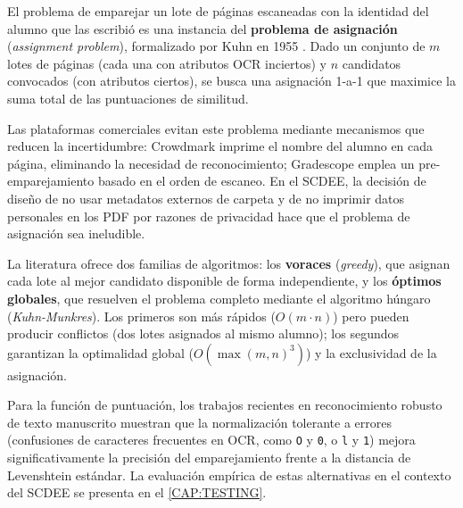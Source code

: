 El problema de emparejar un lote de páginas escaneadas con la identidad
del alumno que las escribió es una instancia del \textbf{problema de
asignación} (\textit{assignment problem}), formalizado por Kuhn en 1955
\cite{kuhn1955hungarian}. Dado un conjunto de \(m\) lotes de páginas
(cada una con atributos OCR inciertos) y \(n\) candidatos convocados
(con atributos ciertos), se busca una asignación 1-a-1 que maximice la
suma total de las puntuaciones de similitud.

Las plataformas comerciales evitan este problema mediante mecanismos que
reducen la incertidumbre: Crowdmark imprime el nombre del alumno en cada
página, eliminando la necesidad de reconocimiento; Gradescope emplea un
pre-emparejamiento basado en el orden de escaneo. En el SCDEE, la
decisión de diseño de no usar metadatos externos de carpeta y de no
imprimir datos personales en los PDF por razones de privacidad hace que
el problema de asignación sea ineludible.

La literatura ofrece dos familias de algoritmos: los \textbf{voraces}
(\textit{greedy}), que asignan cada lote al mejor candidato disponible
de forma independiente, y los \textbf{óptimos globales}, que resuelven
el problema completo mediante el algoritmo húngaro
(\textit{Kuhn-Munkres}). Los primeros son más rápidos (\(O(m \cdot n)\))
pero pueden producir conflictos (dos lotes asignados al mismo alumno);
los segundos garantizan la optimalidad global (\(O(\max(m,n)^3)\)) y la
exclusividad de la asignación.

Para la función de puntuación, los trabajos recientes en reconocimiento
robusto de texto manuscrito \cite{smith2007tesseract,easyocr} muestran
que la normalización tolerante a errores (confusiones de caracteres
frecuentes en OCR, como \texttt{O} y \texttt{0}, o \texttt{l} y
\texttt{1}) mejora significativamente la precisión del emparejamiento
frente a la distancia de Levenshtein estándar. La evaluación empírica de
estas alternativas en el contexto del SCDEE se presenta en el
\cref{CAP:TESTING}.
